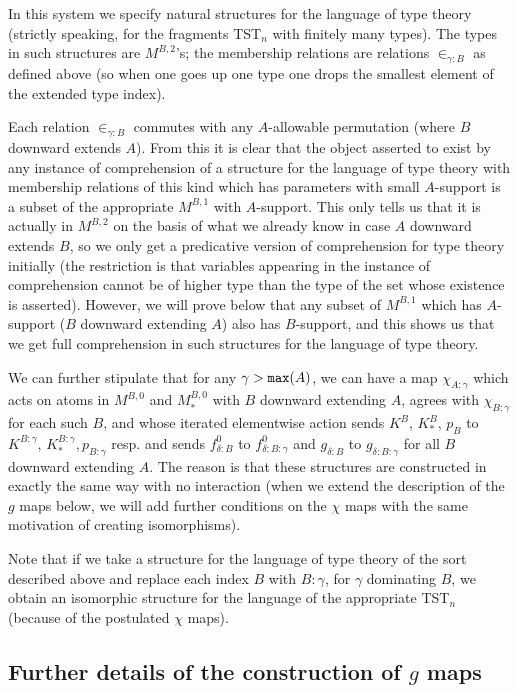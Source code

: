 \documentclass[12pt]{article}
\begin{document}
In this system we specify natural structures for the language of type theory (strictly speaking, for the fragments TST$_n$ with finitely many types).  The types in such structures are $M^{B,2}$'s;  the membership relations are relations $\in_{\gamma:B}$
as defined above (so when one goes up one type one drops the smallest element of the extended type index).  

Each relation $\in_{\gamma:B}$ commutes with any $A$-allowable permutation (where $B$ downward extends $A$).  From this it is clear that the object asserted to exist by any  instance of comprehension of a structure for the language of type theory with membership relations of this kind which has parameters with small $A$-support is a subset of the appropriate $M^{B,1}$ with $A$-support.  This only tells us that it is actually
in $M^{B,2}$ on the basis of what we already know in case $A$ downward extends $B$, so we only get a predicative version of comprehension for type theory initially (the restriction is
that variables appearing in the instance of comprehension cannot be of higher type than the type of the set whose existence is asserted).
However, we will prove below that any subset of $M^{B,1}$ which has $A$-support ($B$ downward extending $A$) also has $B$-support, and this shows us that we get full comprehension in such structures for the language of type theory.

We can further stipulate that for any $\gamma > {\tt max}(A)$, we can have a map $\chi_{A:\gamma}$ which acts on atoms in $M^{B,0}$ and $M^{B,0}_*$ with $B$ downward extending $A$,
agrees with $\chi_{B:\gamma}$ for each such $B$, and whose iterated elementwise action sends $K^B$, $K^B_*$, $p_B$ to $K^{B:\gamma}$, $K^{B:\gamma}_*,p_{B:\gamma}$ resp. and sends $f^0_{\delta:B}$ to
$f^0_{\delta:B:\gamma}$ and $g_{\delta:B}$ to $g_{\delta:B:\gamma}$ for all $B$ downward extending $A$.  The reason is that these structures are constructed in exactly the same way with no interaction (when we extend the description of the $g$ maps below, we will add further conditions on the $\chi$ maps with the same motivation of creating isomorphisms).

Note that if we take a structure for the language of type theory of the sort described above and replace each index $B$ with
$B:\gamma$, for $\gamma$ dominating $B$, we obtain an isomorphic structure for the language of the appropriate TST$_n$ (because of the postulated $\chi$ maps).

\subsection{Further details of the construction of $g$ maps}
\end{document}

